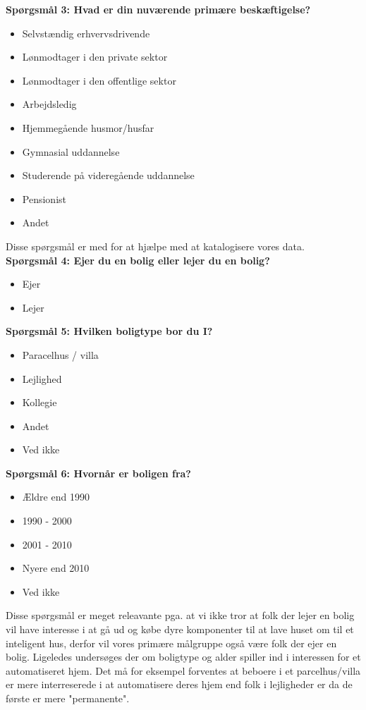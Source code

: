 {\bf{Spørgsmål 3: Hvad er din nuværende primære beskæftigelse?}}
\begin{itemize}
    \item Selvstændig erhvervsdrivende
    \item Lønmodtager i den private sektor
    \item Lønmodtager i den offentlige sektor
    \item Arbejdsledig
    \item Hjemmegående husmor/husfar
    \item Gymnasial uddannelse
    \item Studerende på videregående uddannelse
    \item Pensionist
    \item Andet
\end{itemize}
Disse spørgsmål er med for at hjælpe med at katalogisere vores data.\\

{\bf{Spørgsmål 4: Ejer du en bolig eller lejer du en bolig?}}
\begin{itemize}
    \item Ejer
    \item Lejer
\end{itemize}

{\bf{Spørgsmål 5: Hvilken boligtype bor du I?}}
\begin{itemize}
    \item Paracelhus / villa
    \item Lejlighed
    \item Kollegie
    \item Andet
    \item Ved ikke
\end{itemize}

{\bf{Spørgsmål 6: Hvornår er boligen fra?}}
\begin{itemize}
    \item Ældre end 1990
    \item 1990 - 2000
    \item 2001 - 2010
    \item Nyere end 2010
    \item Ved ikke
\end{itemize}

Disse spørgsmål er meget releavante pga. at vi ikke tror at folk der lejer en bolig vil have interesse i at gå ud og købe dyre komponenter til at lave huset om til et inteligent hus, derfor vil vores primære målgruppe også være folk der ejer en bolig. Ligeledes undersøges der om boligtype og alder spiller ind i interessen for et automatiseret hjem. Det må for eksempel forventes at beboere i et parcelhus/villa er mere interreserede i at automatisere deres hjem end folk i lejligheder er da de første er mere "permanente".\\

